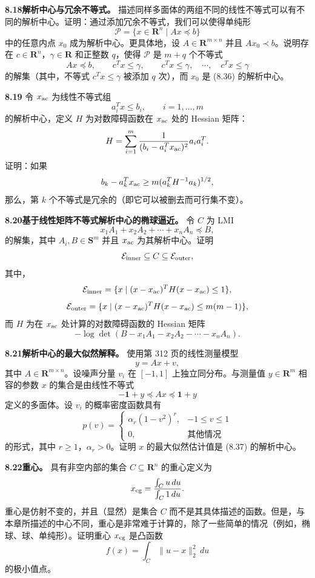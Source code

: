 \documentclass[UTF8,12pt,a4paper,fontset=fandol]{ctexart}
\begin{document}
\noindent\textbf{8.18\quad 解析中心与冗余不等式。}
描述同样多面体的两组不同的线性不等式可以有不同的解析中心。证明：通过添加冗余不等式，我们可以使得单纯形
\[
\mathcal P=\{x\in\mathbf{R}^n\mid Ax\preceq b\}
\]
中的任意内点 $x_0$ 成为解析中心。更具体地，设 $A\in\mathbf{R}^{m\times n}$ 并且 $Ax_0\prec b$。说明存在 $c\in\mathbf{R}^n$，$\gamma\in\mathbf{R}$ 和正整数 $q$，使得 $\mathcal P$ 是 $m+q$ 个不等式
\[
Ax\preceq b,\qquad c^Tx\leq \gamma,\qquad c^Tx\leq \gamma,\quad \cdots,\quad c^Tx\leq \gamma
\tag{8.36}
\]
的解集（其中，不等式 $c^Tx\leq \gamma$ 被添加 $q$ 次），而 $x_0$ 是 (8.36) 的解析中心。

\noindent\textbf{8.19}
令 $x_{\rm ac}$ 为线性不等式组
\[
a_i^Tx\leq b_i,\qquad i=1,\ldots,m
\]
的解析中心，定义 $H$ 为对数障碍函数在 $x_{\rm ac}$ 处的 Hessian 矩阵：
\[
H=\sum_{i=1}^m\frac{1}{(b_i-a_i^Tx_{\rm ac})^2}a_ia_i^T.
\]
证明：如果
\[
b_k-a_k^Tx_{\rm ac}\geq m(a_k^TH^{-1}a_k)^{1/2},
\]
那么，第 $k$ 个不等式是冗余的（即它可以被删去而可行集不变）。

\noindent\textbf{8.20\quad 基于线性矩阵不等式解析中心的椭球逼近。}
令 $C$ 为 LMI
\[
x_1A_1+x_2A_2+\cdots+x_nA_n\preceq B,
\]
的解集，其中 $A_i,B\in\mathbf{S}^m$ 并且 $x_{\rm ac}$ 为其解析中心。证明
\[
\mathcal E_{\rm inner}\subseteq C\subseteq \mathcal E_{\rm outer},
\]
其中，
\[
\mathcal E_{\rm inner}=\{x\mid (x-x_{\rm ac})^TH(x-x_{\rm ac})\leq 1\},
\]
\[
\mathcal E_{\rm outer}=\{x\mid (x-x_{\rm ac})^TH(x-x_{\rm ac})\leq m(m-1)\},
\]
而 $H$ 为在 $x_{\rm ac}$ 处计算的对数障碍函数的 Hessian 矩阵
\[
-\log\det(B-x_1A_1-x_2A_2-\cdots-x_nA_n).
\]

\noindent\textbf{8.21\quad [BYT99] 解析中心的最大似然解释。}
使用第 312 页的线性测量模型
\[
y=Ax+v,
\]
其中 $A\in\mathbf{R}^{m\times n}$。设噪声分量 $v_i$ 在 $[-1,1]$ 上独立同分布。与测量值 $y\in\mathbf{R}^m$ 相容的参数 $x$ 的集合是由线性不等式
\[
-\mathbf{1}+y\preceq Ax\preceq \mathbf{1}+y
\tag{8.37}
\]
定义的多面体。设 $v_i$ 的概率密度函数具有
\[
p(v)=
\begin{cases}
\alpha_r(1-v^2)^r, & -1\leq v\leq 1\\
0, & \mbox{其他情况}
\end{cases}
\]
的形式，其中 $r\geq 1$，$\alpha_r>0$。证明 $x$ 的最大似然估计值是 (8.37) 的解析中心。

\noindent\textbf{8.22\quad 重心。}
具有非空内部的集合 $C\subseteq\mathbf{R}^n$ 的重心定义为
\[
x_{\rm cg}=\frac{\int_C u\,du}{\int_C 1\,du}.
\]
重心是仿射不变的，并且（显然）是集合 $C$ 而不是其具体描述的函数。但是，与本章所描述的中心不同，重心是非常难于计算的，除了一些简单的情况（例如，椭球、球、单纯形）。证明重心 $x_{\rm cg}$ 是凸函数
\[
f(x)=\int_C\|u-x\|_2^2\,du
\]
的极小值点。
\end{document}
